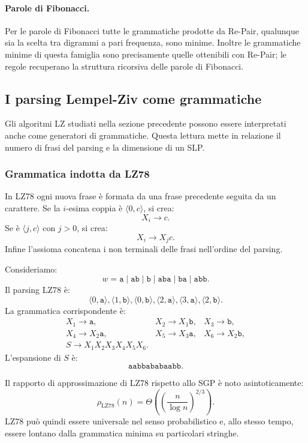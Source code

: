 \documentclass{article}
\theoremstyle{definition}
\numberwithin{equation}{section}
\begin{document}
\paragraph{Parole di Fibonacci.}
Per le parole di Fibonacci tutte le grammatiche prodotte da Re-Pair, qualunque
sia la scelta tra digrammi a pari frequenza, sono minime. Inoltre le grammatiche
minime di questa famiglia sono precisamente quelle ottenibili con Re-Pair; le
regole recuperano la struttura ricorsiva delle parole di Fibonacci.

\subsection{I parsing Lempel-Ziv come grammatiche}
Gli algoritmi LZ studiati nella sezione precedente possono essere interpretati
anche come generatori di grammatiche. Questa lettura mette in relazione il
numero di frasi del parsing e la dimensione di un SLP.

\subsubsection{Grammatica indotta da LZ78}
In LZ78 ogni nuova frase è formata da una frase precedente seguita da un
carattere. Se la $i$-esima coppia è $\langle 0,c\rangle$, si crea:
\[
    X_i\to c.
\]
Se è $\langle j,c\rangle$ con $j>0$, si crea:
\[
    X_i\to X_jc.
\]
Infine l'assioma concatena i non terminali delle frasi nell'ordine del parsing.

Consideriamo:
\[
    w=
    \texttt{a}\mid
    \texttt{ab}\mid
    \texttt{b}\mid
    \texttt{aba}\mid
    \texttt{ba}\mid
    \texttt{abb}.
\]
Il parsing LZ78 è:
\[
    \langle 0,\texttt{a}\rangle,
    \langle 1,\texttt{b}\rangle,
    \langle 0,\texttt{b}\rangle,
    \langle 2,\texttt{a}\rangle,
    \langle 3,\texttt{a}\rangle,
    \langle 2,\texttt{b}\rangle.
\]
La grammatica corrispondente è:
\[
    \begin{array}{lll}
        X_1\to\texttt{a},        &
        X_2\to X_1\texttt{b},    &
        X_3\to\texttt{b},              \\
        X_4\to X_2\texttt{a},    &
        X_5\to X_3\texttt{a},    &
        X_6\to X_2\texttt{b},          \\
        S\to X_1X_2X_3X_4X_5X_6. &   &
    \end{array}
\]
L'espansione di $S$ è:
\[
    \texttt{aabbababaabb}.
\]

Il rapporto di approssimazione di LZ78 rispetto allo SGP è noto
asintoticamente:
\[
    \rho_{\mathrm{LZ78}}(n)
    =
    \Theta\left(
    \left(\frac{n}{\log n}\right)^{2/3}
    \right).
\]
LZ78 può quindi essere universale nel senso probabilistico e, allo stesso
tempo, essere lontano dalla grammatica minima su particolari stringhe.
\end{document}
